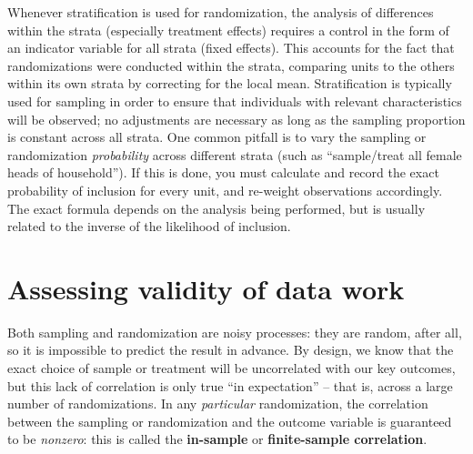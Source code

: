 Whenever stratification is used for randomization,
the analysis of differences within the strata (especially treatment effects)
requires a control in the form of an indicator variable for all strata (fixed effects).
This accounts for the fact that randomizations were conducted within the strata,
comparing units to the others within its own strata by correcting for the local mean.
Stratification is typically used for sampling
in order to ensure that individuals with relevant characteristics will be observed;
no adjustments are necessary as long as the sampling proportion is constant across all strata.
One common pitfall is to vary the sampling or randomization \textit{probability}
across different strata (such as ``sample/treat all female heads of household'').
If this is done, you must calculate and record the exact probability
of inclusion for every unit, and re-weight observations accordingly.
The exact formula depends on the analysis being performed,
but is usually related to the inverse of the likelihood of inclusion.


\section{Assessing validity of data work}

Both sampling and randomization are noisy processes:
they are random, after all, so it is impossible to predict the result in advance.
By design, we know that the exact choice of sample or treatment
will be uncorrelated with our key outcomes,
but this lack of correlation is only true ``in expectation'' --
that is, across a large number of randomizations.
In any \textit{particular} randomization,
the correlation between the sampling or randomization and the outcome variable
is guaranteed to be \textit{nonzero}:
this is called the \textbf{in-sample} or \textbf{finite-sample correlation}.

